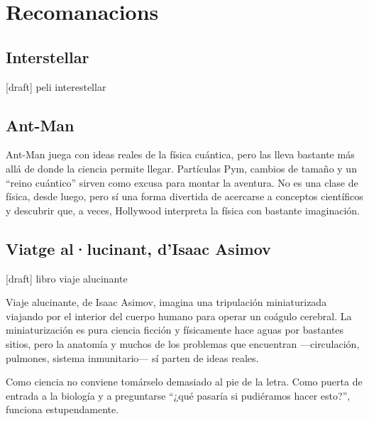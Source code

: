 \section{Recomanacions}

\subsection{Interstellar}

[draft] peli interestellar

\subsection{Ant-Man}

Ant-Man juega con ideas reales de la física cuántica, pero las lleva bastante más allá de donde la ciencia permite llegar. Partículas Pym, cambios de tamaño y un “reino cuántico” sirven como excusa para montar la aventura. No es una clase de física, desde luego, pero sí una forma divertida de acercarse a conceptos científicos y descubrir que, a veces, Hollywood interpreta la física con bastante imaginación.

\subsection{Viatge al·lucinant, d'Isaac Asimov}

[draft] libro viaje alucinante

Viaje alucinante, de Isaac Asimov, imagina una tripulación miniaturizada viajando por el interior del cuerpo humano para operar un coágulo cerebral. La miniaturización es pura ciencia ficción y físicamente hace aguas por bastantes sitios, pero la anatomía y muchos de los problemas que encuentran —circulación, pulmones, sistema inmunitario— sí parten de ideas reales.

Como ciencia no conviene tomárselo demasiado al pie de la letra. Como puerta de entrada a la biología y a preguntarse “¿qué pasaría si pudiéramos hacer esto?”, funciona estupendamente.
